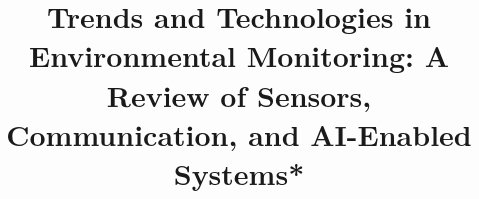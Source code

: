 
% 
% 



% 
\documentclass[conference,onecolumn,letterpaper,12pt,english,nofonttune]{IEEEtran}
\IEEEoverridecommandlockouts
\usepackage[letterpaper, margin=2.5cm]{geometry} %
\usepackage{setspace} %
\usepackage{cite}
\usepackage{amsmath,amssymb,amsfonts}
\usepackage{algorithmic}
\usepackage{graphicx}
\usepackage{textcomp}
\usepackage{xcolor}
\def\BibTeX{{\rm B\kern-.05em{\sc i\kern-.025em b}\kern-.08em
    T\kern-.1667em\lower.7ex\hbox{E}\kern-.125emX}}

\doublespacing
    

\title{Trends and Technologies in Environmental Monitoring: A Review of Sensors, Communication, and AI-Enabled Systems*}

\maketitle

\begin{abstract}
Wireless Sensor Networks (WSNs) are foundational for addressing modern environmental monitoring challenges driven by climate change. This review provides an integrated analysis of the trends and challenges, examining sensing technologies for water, soil, and air, alongside communication protocols and best practices. We consolidate advances across sensors, networking, and system-level challenges, including energy efficiency, security, and the integration of the Artificial Intelligence of Things (AIoT). By bridging these multidisciplinary domains, this work serves as a foundational guide for future research and the development of next-generation monitoring systems.
\end{abstract}

